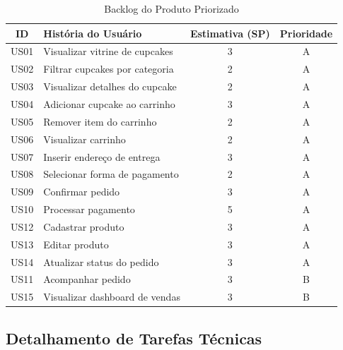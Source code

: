 \documentclass[12pt]{article}
\begin{document}
\begin{table}[H]
\centering
\renewcommand{\arraystretch}{1.3}
\begin{tabular}{|c|p{8.5cm}|c|c|}
\hline
\rowcolor{gray!40} \textbf{ID} & \textbf{História do Usuário} & \textbf{Estimativa (SP)} & \textbf{Prioridade} \\ \hline
US01 & Visualizar vitrine de cupcakes & 3 & A \\ \hline
US02 & Filtrar cupcakes por categoria & 2 & A \\ \hline
US03 & Visualizar detalhes do cupcake & 2 & A \\ \hline
US04 & Adicionar cupcake ao carrinho & 3 & A \\ \hline
US05 & Remover item do carrinho & 2 & A \\ \hline
US06 & Visualizar carrinho & 2 & A \\ \hline
US07 & Inserir endereço de entrega & 3 & A \\ \hline
US08 & Selecionar forma de pagamento & 2 & A \\ \hline
US09 & Confirmar pedido & 3 & A \\ \hline
US10 & Processar pagamento & 5 & A \\ \hline
US12 & Cadastrar produto & 3 & A \\ \hline
US13 & Editar produto & 3 & A \\ \hline
US14 & Atualizar status do pedido & 3 & A \\ \hline
US11 & Acompanhar pedido & 3 & B \\ \hline
US15 & Visualizar dashboard de vendas & 3 & B \\ \hline
\end{tabular}
\caption{Backlog do Produto Priorizado}
\end{table}

\newpage
\subsection{Detalhamento de Tarefas Técnicas}
\end{document}
